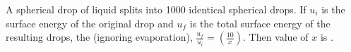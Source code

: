 \item A spherical drop of liquid splits into 1000 identical spherical drops. If $u_i$ is the surface energy of the original drop and $u_f$ is the total surface energy of the resulting drops, the (ignoring evaporation), $\frac{u_f}{u_i} = \left(\frac{10}{x} \right)$. Then value of $x$ is \underline{\hspace{2.5cm}}.